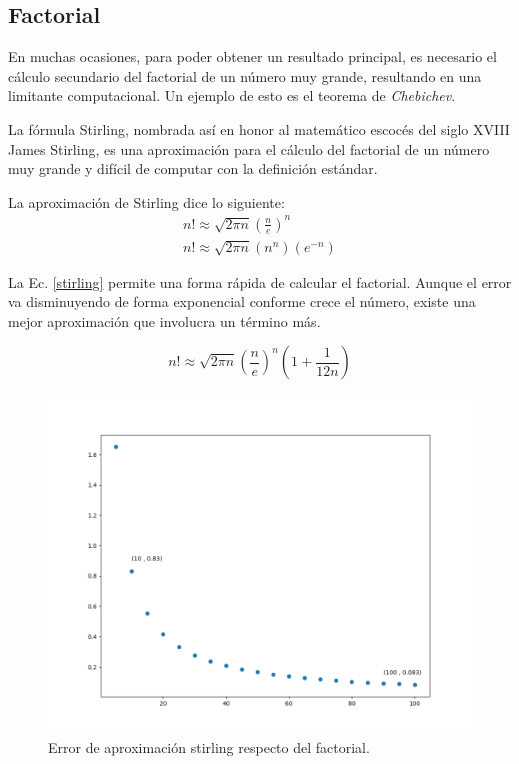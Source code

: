 \newpage
\subsection{Factorial}
En muchas ocasiones, para poder obtener un resultado principal, es necesario el
c\'alculo secundario del factorial de un n\'umero muy grande, resultando en una
limitante computacional. Un ejemplo de esto es el teorema de \textit{Chebichev}.

La f\'ormula Stirling, nombrada así en honor al matem\'atico escoc\'es del siglo
XVIII James Stirling, es una aproximaci\'on para el c\'alculo del factorial de
un n\'umero muy grande y dif\'icil de computar con la definici\'on est\'andar.

La aproximaci\'on de Stirling dice lo siguiente:
\begin{eqnarray}
	n!\approx \sqrt{2\pi n}(\frac{n}{e})^n\\
	n!\approx \sqrt{2\pi n} (n^n)(e^{-n})
	\label{stirling}
\end{eqnarray}

La Ec. \eqref{stirling} permite una forma r\'apida de calcular el factorial.
Aunque el error va disminuyendo de forma exponencial conforme crece el n\'umero,
existe una mejor aproximaci\'on que involucra un t\'ermino m\'as.


\begin{equation}
	n!\approx \sqrt{2\pi n}(\frac{n}{e})^n(1+\frac{1}{12n})
	\label{Stirling}
\end{equation}
\begin{figure}[h!]
	\centering
\includegraphics[scale=0.50]{figures/stirling.png}
\caption{Error de aproximaci\'on stirling respecto del factorial.}
\label{stirling_error}
\end{figure}
